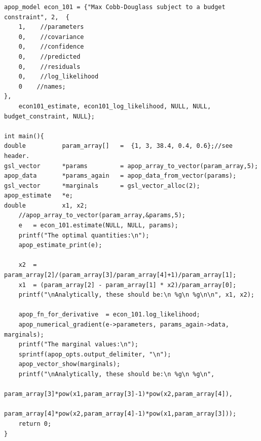 \begin{lstlisting}
apop_model econ_101 = {"Max Cobb-Douglass subject to a budget constraint", 2,  {
    1,    //parameters
    0,    //covariance
    0,    //confidence
    0,    //predicted
    0,    //residuals
    0,    //log_likelihood
    0    //names;
},         
    econ101_estimate, econ101_log_likelihood, NULL, NULL, budget_constraint, NULL};

int main(){
double          param_array[]   =  {1, 3, 38.4, 0.4, 0.6};//see header.
gsl_vector      *params         = apop_array_to_vector(param_array,5);
apop_data       *params_again   = apop_data_from_vector(params);
gsl_vector      *marginals      = gsl_vector_alloc(2);
apop_estimate   *e;
double          x1, x2;
    //apop_array_to_vector(param_array,&params,5);
    e   = econ_101.estimate(NULL, NULL, params);
    printf("The optimal quantities:\n");
    apop_estimate_print(e);

    x2  = param_array[2]/(param_array[3]/param_array[4]+1)/param_array[1];
    x1  = (param_array[2] - param_array[1] * x2)/param_array[0];
    printf("\nAnalytically, these should be:\n %g\n %g\n\n", x1, x2);

    apop_fn_for_derivative  = econ_101.log_likelihood;
    apop_numerical_gradient(e->parameters, params_again->data, marginals);
    printf("The marginal values:\n");
    sprintf(apop_opts.output_delimiter, "\n");
    apop_vector_show(marginals);
    printf("\nAnalytically, these should be:\n %g\n %g\n", 
            param_array[3]*pow(x1,param_array[3]-1)*pow(x2,param_array[4]),
            param_array[4]*pow(x2,param_array[4]-1)*pow(x1,param_array[3]));
    return 0;
}
\end{lstlisting}
